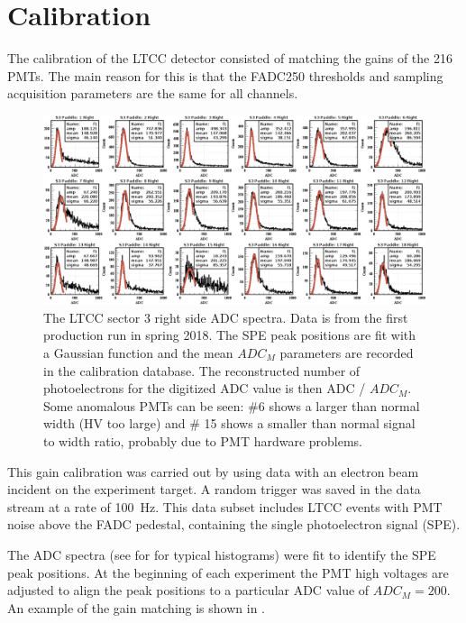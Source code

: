 \section{Calibration}

The calibration of the LTCC detector consisted of matching the gains of the 216 PMTs. The main reason for this
is that the FADC250 thresholds and sampling acquisition parameters are the same for all channels.

\begin{figure}
	\centering
	\includegraphics[width=2.1\columnwidth,keepaspectratio]{img/spe.png}
	\caption{The LTCC sector 3 right side ADC spectra. Data is from the first production run in spring 2018.
          The SPE peak positions are fit with a Gaussian function and the mean $ADC_M$ parameters are recorded
          in the calibration database. The reconstructed number of photoelectrons for the digitized ADC value is
          then ADC / $ADC_M$. Some anomalous PMTs can be seen: \#6 shows a larger than normal width (HV too large)
          and \# 15 shows a smaller than normal signal to width ratio, probably due to PMT hardware problems.}
	\label{fig:speCalibration}
\end{figure}

This gain calibration was carried out by using data with an electron beam incident on the experiment target.
A random trigger was saved in the data stream at a rate of 100~Hz. This data subset includes LTCC events with
PMT noise above the FADC pedestal, containing the single photoelectron signal (SPE).

The ADC spectra (see for  for typical histograms) were fit to identify the SPE peak positions.
At the beginning of each experiment the PMT high voltages are adjusted to align the peak positions
to a particular ADC value of $ADC_M = 200$. An example of the gain matching is shown in .

